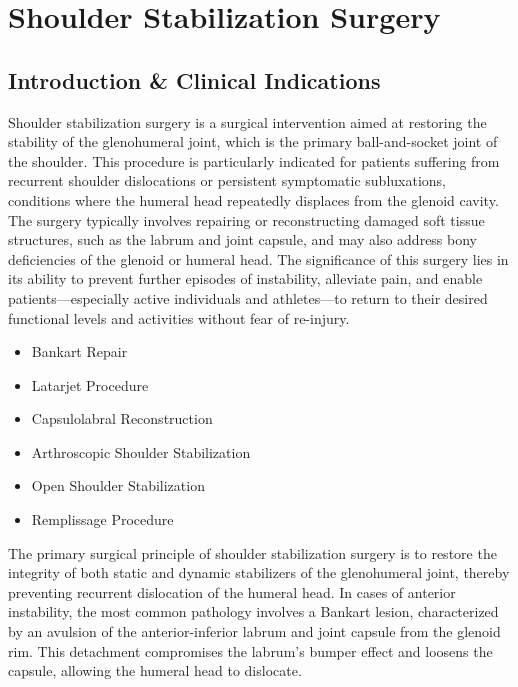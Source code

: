 \chapter{Shoulder Stabilization Surgery}

\section*{Introduction \& Clinical Indications}
Shoulder stabilization surgery is a surgical intervention aimed at restoring the stability of the glenohumeral joint, which is the primary ball-and-socket joint of the shoulder. This procedure is particularly indicated for patients suffering from recurrent shoulder dislocations or persistent symptomatic subluxations, conditions where the humeral head repeatedly displaces from the glenoid cavity. The surgery typically involves repairing or reconstructing damaged soft tissue structures, such as the labrum and joint capsule, and may also address bony deficiencies of the glenoid or humeral head. The significance of this surgery lies in its ability to prevent further episodes of instability, alleviate pain, and enable patients—especially active individuals and athletes—to return to their desired functional levels and activities without fear of re-injury.

\begin{itemize}
  \item Bankart Repair
  \item Latarjet Procedure
  \item Capsulolabral Reconstruction
  \item Arthroscopic Shoulder Stabilization
  \item Open Shoulder Stabilization
  \item Remplissage Procedure
\end{itemize}

The primary surgical principle of shoulder stabilization surgery is to restore the integrity of both static and dynamic stabilizers of the glenohumeral joint, thereby preventing recurrent dislocation of the humeral head. In cases of anterior instability, the most common pathology involves a Bankart lesion, characterized by an avulsion of the anterior-inferior labrum and joint capsule from the glenoid rim. This detachment compromises the labrum's bumper effect and loosens the capsule, allowing the humeral head to dislocate.

